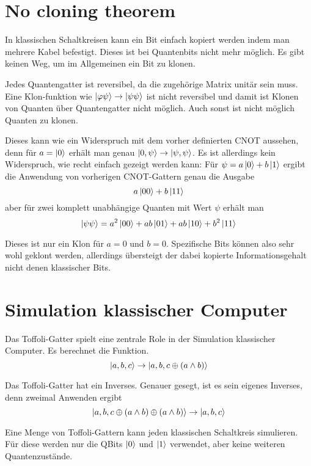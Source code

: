 \documentclass{acm_proc_article-sp}
\begin{document}
\section{No cloning theorem}
\label{noclone}

In klassischen Schaltkreisen kann ein Bit einfach kopiert werden indem man mehrere Kabel befestigt. Dieses ist
bei Quantenbits nicht mehr möglich. Es gibt keinen Weg, um im Allgemeinen ein Bit zu klonen.

Jedes Quantengatter ist reversibel, da die zugehörige Matrix unitär sein muss. 
Eine Klon-funktion wie $\left|\varphi\psi\right\rangle \rightarrow \left|\psi\psi\right\rangle$ ist nicht reversibel und damit ist Klonen von Quanten über
Quantengatter nicht möglich. Auch sonst ist nicht möglich Quanten zu klonen.

Dieses kann wie ein Widerspruch mit dem vorher definierten CNOT aussehen, denn für $a=\left|0\right\rangle$ erhält man
genau $\left|0, \psi\right\rangle \rightarrow \left|\psi, \psi\right\rangle$.
Es ist allerdings kein Widerspruch, wie recht einfach gezeigt werden kann:
Für $\psi = a \left|0\right\rangle + b \left|1\right\rangle$ ergibt die Anwendung von vorherigen CNOT-Gattern genau die Ausgabe
\[
    a \left|00\right\rangle + b \left|11\right\rangle 
\]
aber für zwei komplett unabhängige Quanten mit Wert $\psi$ erhält man
\[
    \left|\psi \psi\right\rangle = a^2 \left|00\right\rangle + ab \left|01\right\rangle + ab \left|10\right\rangle + b^2 \left|11\right\rangle 
\]

Dieses ist nur ein Klon für $a=0$ und $b=0$.
Spezifische Bits können also sehr wohl geklont werden, allerdings übersteigt der dabei kopierte Informationsgehalt
nicht denen klassischer Bits.

\section{Simulation klassischer Computer}
\label{Simulate}

Das Toffoli-Gatter spielt eine zentrale Role in der Simulation klassischer Computer.
Es berechnet die Funktion.
\[
    \left|a, b, c\right\rangle \rightarrow \left|a, b, c\oplus (a\wedge b)\right\rangle
\]

\begin{center}
    \pictureToffoli
\end{center}


Das Toffoli-Gatter hat ein Inverses. Genauer gesegt, ist es sein eigenes Inverses, denn zweimal Anwenden
ergibt
\[
    \left|a, b, c\oplus (a\wedge b) \oplus (a\wedge b)\right\rangle \rightarrow \left|a, b, c\right\rangle
\]


Eine Menge von Toffoli-Gattern kann jeden klassischen Schaltkreis simulieren. Für diese werden nur die QBits
$\left|0\right\rangle$ und $\left|1\right\rangle$ verwendet, aber keine weiteren Quantenzustände.
\end{document}
